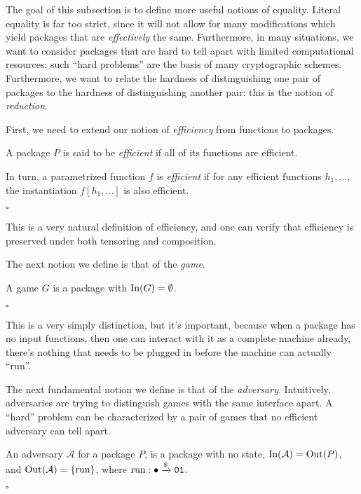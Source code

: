 The goal of this subsection is to define more useful notions of equality.
Literal equality is far too strict, since it will not allow
for many modifications which yield packages that are \emph{effectively}
the same.
Furthermore, in many situations, we want to consider packages
that are hard to tell apart with limited computational resources;
such ``hard problems'' are the basis of many cryptographic schemes.
Furthermore, we want to relate the hardness of distinguishing
one pair of packages to the hardness of distinguishing another pair:
this is the notion of \emph{reduction}.

First, we need to extend our notion of \emph{efficiency}
from functions to packages.

\begin{definition}
    A package $P$ is said to be \emph{efficient} if all of its
    functions are efficient.

    In turn, a parametrized function $f$ is \emph{efficient}
    if for any efficient functions $h_1, \ldots$, the instantiation
    $f[h_1, \ldots]$ is also efficient.

    $\square$
\end{definition}

This is a very natural definition of efficiency,
and one can verify that efficiency is preserved under both
tensoring and composition.

The next notion we define is that of the \emph{game}.
\begin{definition}[Game]
    A game $G$ is a package with $\text{In}(G) = \emptyset$.

    $\square$
\end{definition}

This is a very simply distinction, but it's important,
because when a package has no input functions, then one can interact
with it as a complete machine already, there's nothing that needs
to be plugged in before the machine can actually ``run''.

The next fundamental notion we define is that of the \emph{adversary}.
Intuitively, adversaries are trying to distinguish games with the same
interface apart.
A ``hard'' problem can be characterized by a pair of games that
no efficient adversary can tell apart.

\begin{definition}[Adversaries]
    An adversary $\mathcal{A}$ for a package $P$, is a package
    with no state, $\text{In}(\mathcal{A}) = \text{Out}(P)$, and $\text{Out}(\mathcal{A}) = \{\text{run}\}$,
    where $\text{run} : \bullet \xrightarrow{\$} \texttt{01}$.

    $\square$
\end{definition}

